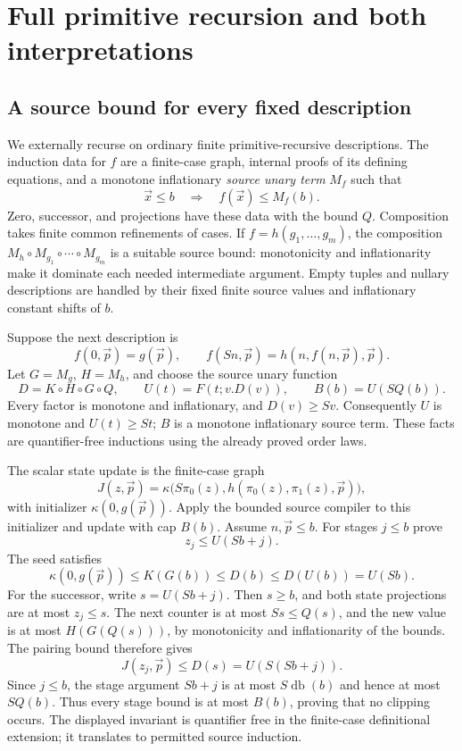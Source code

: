 \documentclass[11pt,letterpaper]{article}
\theoremstyle{definition}\newtheorem{definition}[theorem]{Definition}
\theoremstyle{remark}\newtheorem{remark}[theorem]{Remark}
\begin{document}
\section{Full primitive recursion and both interpretations}
\label{sec:selfseed-equivalence}

\subsection{A source bound for every fixed description}
We externally recurse on ordinary finite primitive-recursive
descriptions. The induction data for $f$ are a finite-case graph,
internal proofs of its defining equations, and a monotone inflationary
\emph{source unary term} $M_f$ such that
\[
              \vec x\le b\quad\Longrightarrow\quad f(\vec x)\le M_f(b).
\]
Zero, successor, and projections have these data with the bound $Q$.
Composition takes finite common refinements of cases. If
$f=h(g_1,\ldots,g_m)$, the composition
$M_h\circ M_{g_1}\circ\cdots\circ M_{g_m}$ is a suitable source
bound: monotonicity and inflationarity make it dominate each needed
intermediate argument. Empty tuples and nullary descriptions are
handled by their fixed finite source values and inflationary constant
shifts of $b$.

Suppose the next description is
\[
f(0,\vec p)=g(\vec p),\qquad
f(Sn,\vec p)=h(n,f(n,\vec p),\vec p).
\]
Let $G=M_g$, $H=M_h$, and choose the source unary function
\[
D=K\circ H\circ G\circ Q,\qquad
U(t)=F(t;v.D(v)),\qquad B(b)=U(SQ(b)).
\]
Every factor is monotone and inflationary, and $D(v)\ge Sv$.
Consequently $U$ is monotone and $U(t)\ge St$; $B$ is a monotone
inflationary source term. These facts are quantifier-free inductions
using the already proved order laws.

The scalar state update is the finite-case graph
\[
 J(z,\vec p)=\kappa\bigl(S\pi_0(z),
                    h(\pi_0(z),\pi_1(z),\vec p)\bigr),
\]
with initializer $\kappa(0,g(\vec p))$. Apply the bounded source
compiler to this initializer and update with cap $B(b)$. Assume
$n,\vec p\le b$. For stages $j\le b$ prove
\[
                          z_j\le U(Sb+j).
 \tag{PR-stage}
\]
The seed satisfies
\[
\kappa(0,g(\vec p))\le K(G(b))\le D(b)
                         \le D(U(b))=U(Sb).
\]
For the successor, write $s=U(Sb+j)$. Then $s\ge b$, and both
state projections are at most $z_j\le s$. The next counter is
at most $Ss\le Q(s)$, and the new value is at most
$H(G(Q(s)))$, by monotonicity and inflationarity of the bounds.
The pairing bound therefore gives
\[
                   J(z_j,\vec p)\le D(s)=U(S(Sb+j)).
\]
Since $j\le b$, the stage argument $Sb+j$ is at most
$S\operatorname{db}(b)$ and hence at most $SQ(b)$. Thus every
stage bound is at most $B(b)$, proving that no clipping occurs.
The displayed invariant is quantifier free in the finite-case
definitional extension; it translates to permitted source induction.
\end{document}
